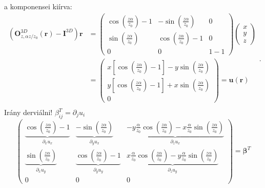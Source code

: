 \documentclass[12pt,a4paper]{scrartcl}
\let\mathbf\bm
\begin{document}
a komponensei kiírva:
\[\begin{aligned}
  \left( {{\mathbf{O}}_{z,\alpha z/{z_0}}^{3D}\left( {\mathbf{r}} \right) - {{\mathbf{I}}^{3D}}} \right){\mathbf{r}} &  = \left( {\begin{array}{*{20}{c}}
  {\cos \left( {\frac{{z\alpha }}{{{z_0}}}} \right) - 1}&{ - \sin \left( {\frac{{z\alpha }}{{{z_0}}}} \right)}&0 \\ 
  {\sin \left( {\frac{{z\alpha }}{{{z_0}}}} \right)}&{\cos \left( {\frac{{z\alpha }}{{{z_0}}}} \right) - 1}&0 \\ 
  0&0&{1 - 1} 
\end{array}} \right)\left( {\begin{array}{*{20}{c}}
  x \\ 
  y \\ 
  z 
\end{array}} \right) \\ 
   &  = \left( {\begin{array}{*{20}{c}}
  {x\left[ {\cos \left( {\frac{{z\alpha }}{{{z_0}}}} \right) - 1} \right] - y\sin \left( {\frac{{z\alpha }}{{{z_0}}}} \right)} \\ 
  {y\left[ {\cos \left( {\frac{{z\alpha }}{{{z_0}}}} \right) - 1} \right] + x\sin \left( {\frac{{z\alpha }}{{{z_0}}}} \right)} \\ 
  0 
\end{array}} \right) = {\mathbf{u}}\left( {\mathbf{r}} \right) \\ 
\end{aligned} .\]
Irány derviálni! ${\beta^T _{ij}} = {\partial _j}{u_i}$
\begin{equation} \label{eq:csavaras_disztorzio}
\left( {\begin{array}{*{20}{c}}
  {\underbrace {\cos \left( {\frac{{z\alpha }}{{{z_0}}}} \right) - 1}_{{\partial _x}{u_x}}}&{\underbrace { - \sin \left( {\frac{{z\alpha }}{{{z_0}}}} \right)}_{{\partial _y}{u_x}}}&{\underbrace { - y\frac{\alpha }{{{z_0}}}\cos \left( {\frac{{z\alpha }}{{{z_0}}}} \right) - x\frac{\alpha }{{{z_0}}}\sin \left( {\frac{{z\alpha }}{{{z_0}}}} \right)}_{{\partial _z}{u_x}}} \\ 
  {\underbrace {\sin \left( {\frac{{z\alpha }}{{{z_0}}}} \right)}_{{\partial _x}{u_y}}}&{\underbrace {\cos \left( {\frac{{z\alpha }}{{{z_0}}}} \right) - 1}_{{\partial _y}{u_y}}}&{\underbrace {x\frac{\alpha }{{{z_0}}}\cos \left( {\frac{{z\alpha }}{{{z_0}}}} \right) - y\frac{\alpha }{{{z_0}}}\sin \left( {\frac{{z\alpha }}{{{z_0}}}} \right)}_{{\partial _z}{u_y}}} \\ 
  0&0&0 
\end{array}} \right) = {{\mathbf{\beta }}^T}
\end{equation}
\end{document}
